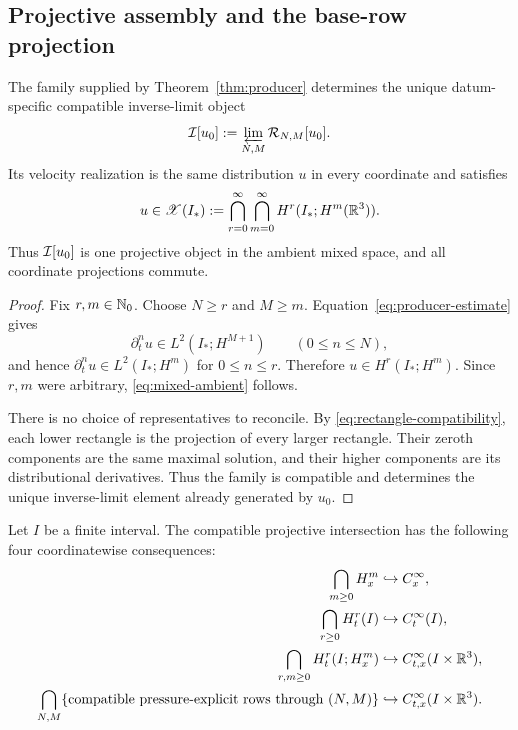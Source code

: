\subsection{Projective assembly and the base-row projection}

\begin{proposition}
\label{prop:projective}
The family supplied by Theorem~\ref{thm:producer} determines the unique
datum-specific compatible inverse-limit object
\begin{equation}
 \mathcal I[u_0]
 :=\varprojlim_{N,M}\mathcal R_{N,M}[u_0].
 \label{eq:mixed-intersection}
\end{equation}
Its velocity realization is the same distribution \(u\) in every coordinate
and satisfies
\begin{equation}
 u\in\mathscr X(I_*):=
 \bigcap_{r=0}^{\infty}\bigcap_{m=0}^{\infty}
 H^r(I_*;H^m(\mathbb R^3)).
 \label{eq:mixed-ambient}
\end{equation}
Thus \(\mathcal I[u_0]\) is one projective object in the ambient mixed space, and all
coordinate projections commute.
\end{proposition}

\begin{proof}
Fix \(r,m\in\mathbb N_0\). Choose \(N\geq r\) and \(M\geq m\).
Equation~\eqref{eq:producer-estimate} gives
\[
 \partial_t^n u\in L^2(I_*;H^{M+1})
 \qquad(0\leq n\leq N),
\]
and hence \(\partial_t^n u\in L^2(I_*;H^m)\) for
\(0\leq n\leq r\). Therefore \(u\in H^r(I_*;H^m)\). Since \(r,m\) were
arbitrary, \eqref{eq:mixed-ambient} follows.

There is no choice of representatives to reconcile.  By
\eqref{eq:rectangle-compatibility}, each lower rectangle is the projection of
every larger rectangle.  Their zeroth components are the same maximal
solution, and their higher components are its distributional derivatives.
Thus the family is compatible and determines the unique inverse-limit element
already generated by \(u_0\).
\end{proof}

\begin{proposition}
\label{prop:columnwise-smoothness}
Let \(I\) be a finite interval.  The compatible projective intersection has
the following four coordinatewise consequences:
\begin{align}
 \bigcap_{m\geq0}H_x^m
 &\hookrightarrow C_x^\infty,
 \label{eq:spatial-column-smoothness}\\
 \bigcap_{r\geq0}H_t^r(I)
 &\hookrightarrow C_t^\infty(I),
 \label{eq:height-column-smoothness}\\
 \bigcap_{r,m\geq0}H_t^r(I;H_x^m)
 &\hookrightarrow C_{t,x}^\infty(I\times\mathbb R^3),
 \label{eq:velocity-column-smoothness}\\
 \bigcap_{N,M}\{\text{compatible pressure-explicit rows through }(N,M)\}
 &\hookrightarrow C_{t,x}^\infty(I\times\mathbb R^3).
 \label{eq:jet-column-smoothness}
\end{align}
\end{proposition}

